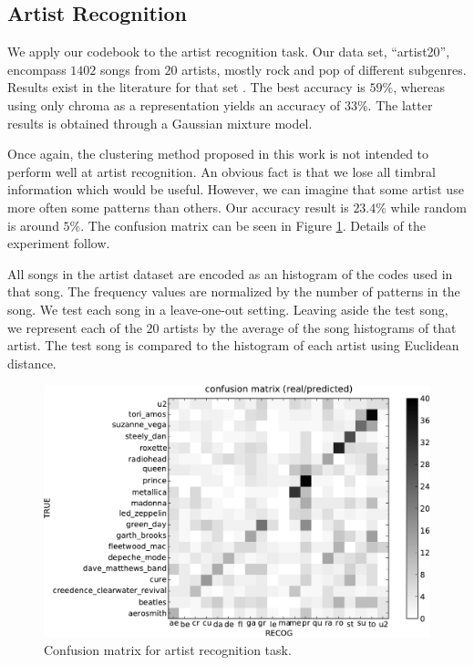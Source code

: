 \documentclass{article}
\begin{document}
\subsection{Artist Recognition} \label{ssec:artist}

We apply our codebook to the artist recognition task.
Our data set, ``artist20'', encompass $1402$ songs from $20$ artists, 
mostly rock and pop of different subgenres. Results exist in the
literature for that set \cite{Ellis2007}. The best accuracy is
$59\%$, whereas using only chroma as a representation yields an
accuracy of $33\%$. The latter results is obtained through a
Gaussian mixture model.

Once again, the clustering method proposed in this work is not
intended to perform well at artist recognition. An obvious fact is that
we lose all timbral information which would be useful. However, we can
imagine that some artist use more often some patterns than others.
Our accuracy result is $23.4\%$ while random
is around $5\%$. 
The confusion matrix can be seen in Figure \ref{fig:conf_mat}.
Details of the experiment follow.

All songs in the artist dataset are encoded as an histogram of the codes
used in that song. The frequency values are normalized by the number
of patterns in the song. We test each song in a leave-one-out setting.
Leaving aside the test song, we represent each of the $20$ artists by the 
average of
the song histograms of that artist. The test song is compared to
the histogram of each artist using Euclidean distance.


\begin{figure}[htb]
\includegraphics[width=.9\columnwidth]{conf_mat_per_artist}
\caption{\small{Confusion matrix for artist recognition task.}}
\label{fig:conf_mat}
\end{figure}
\end{document}
